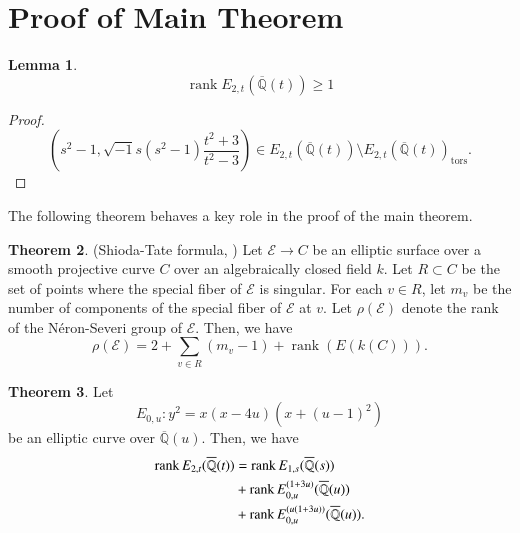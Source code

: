 \documentclass[a4paper]{jarticle} %
\theoremstyle{definition}
\newtheorem{thm}{Theorem}[section]
\newtheorem{lem}[thm]{Lemma}
\theoremstyle{remark}
\DeclareMathOperator{\rank}{rank}
\newcommand{\Neron}{N\'eron}
\begin{document}
\section{Proof of Main Theorem}
\begin{lem}
    \begin{equation*}
        \rank E_{2,t}(\overline{\mathbb{Q}}(t)) \geq 1
    \end{equation*}
\end{lem}
\begin{proof}
    \begin{equation*}
        \left(s^{2} - 1, \sqrt{-1} s(s^{2} - 1) \frac{t^{2} + 3}{t^{2} - 3} \right) \in E_{2,t}(\overline{\mathbb{Q}}(t)) \setminus E_{2,t}(\overline{\mathbb{Q}}(t))_{\text{tors}}.
    \end{equation*}
\end{proof}

The following theorem behaves a key role in the proof of the main theorem.
\begin{thm}{(Shioda-Tate formula, \cite[Corollary 5.3]{ref:shioda1990})}
    \label{thm:shioda}
    Let $\mathcal{E} \to C$ be an elliptic surface over a smooth projective curve $C$ over an algebraically closed field $k$.
    Let $R \subset C$ be the set of points where the special fiber of $\mathcal{E}$ is singular.
    For each $v \in R$, let $m_{v}$ be the number of components of the special fiber of $\mathcal{E}$ at $v$.
    Let $\rho(\mathcal{E})$ denote the rank of the \Neron-Severi group of $\mathcal{E}$.
    Then, we have
    \begin{equation*}
        \rho (\mathcal{E}) = 2 + \sum_{v \in R} (m_{v} - 1) + \rank(E(k(C))).
    \end{equation*}
\end{thm}

\begin{thm}
    Let
    \begin{equation*}
        E_{0,u}: y^{2} = x(x - 4u)(x + (u - 1)^{2})
    \end{equation*}
    be an elliptic curve over $\overline{\mathbb{Q}}(u)$.
    Then, we have
    \vspace{1em}
    \begin{equation}
        \label{eq:rankdecomposition}
        \begin{aligned}
            \rank E_{2,t}(\overline{\mathbb{Q}}(t)) & = \rank E_{1,s}(\overline{\mathbb{Q}}(s))                \\
                                                    & + \rank E_{0,u}^{(1 + 3u)}(\overline{\mathbb{Q}}(u))     \\
                                                    & + \rank E_{0,u}^{(u(1 + 3u))}(\overline{\mathbb{Q}}(u)).
        \end{aligned}
        \vspace{1em}
    \end{equation}
\end{thm}
\end{document}
